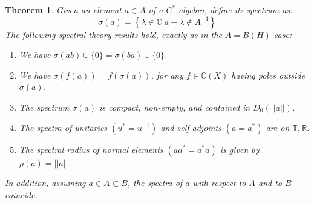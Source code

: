 \documentclass[12pt]{amsbook}
\newtheorem{theorem}{Theorem}[chapter]
\begin{document}

\begin{theorem}
Given an element $a\in A$ of a $C^*$-algebra, define its spectrum as:
$$\sigma(a)=\left\{\lambda\in\mathbb C\Big|a-\lambda\notin A^{-1}\right\}$$
The following spectral theory results hold, exactly as in the $A=B(H)$ case:
\begin{enumerate}
\item We have $\sigma(ab)\cup\{0\}=\sigma(ba)\cup\{0\}$.

\item We have $\sigma(f(a))=f(\sigma(a))$, for any $f\in\mathbb C(X)$ having poles outside $\sigma(a)$.

\item The spectrum $\sigma(a)$ is compact, non-empty, and contained in $D_0(||a||)$.

\item The spectra of unitaries $(u^*=u^{-1})$ and self-adjoints $(a=a^*)$ are on $\mathbb T,\mathbb R$.

\item The spectral radius of normal elements $(aa^*=a^*a)$ is given by $\rho(a)=||a||$.
\end{enumerate}
In addition, assuming $a\in A\subset B$, the spectra of $a$ with respect to $A$ and to $B$ coincide.
\end{theorem}
\end{document}

